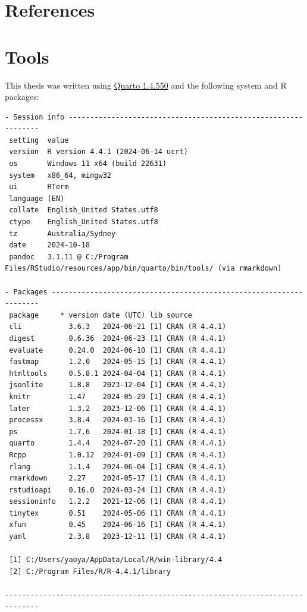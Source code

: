 \documentclass[
  a4paper,
  oneside,
  openany,
  12pt,
  onecolumn]{book}
\theoremstyle{plain}
\theoremstyle{definition}
\theoremstyle{remark}
\begin{document}

\chapter*{References}\label{references}


\renewcommand{\bibsection}{}


\cleardoublepage
{}
{}
\appendix

\chapter{Tools}\label{sec-tools}

This thesis was written using \href{https://quarto.org/}{Quarto 1.4.550}
\citep{quarto} and the following system and R packages:

\begin{verbatim}
- Session info ---------------------------------------------------------------
 setting  value
 version  R version 4.4.1 (2024-06-14 ucrt)
 os       Windows 11 x64 (build 22631)
 system   x86_64, mingw32
 ui       RTerm
 language (EN)
 collate  English_United States.utf8
 ctype    English_United States.utf8
 tz       Australia/Sydney
 date     2024-10-18
 pandoc   3.1.11 @ C:/Program Files/RStudio/resources/app/bin/quarto/bin/tools/ (via rmarkdown)

- Packages -------------------------------------------------------------------
 package     * version date (UTC) lib source
 cli           3.6.3   2024-06-21 [1] CRAN (R 4.4.1)
 digest        0.6.36  2024-06-23 [1] CRAN (R 4.4.1)
 evaluate      0.24.0  2024-06-10 [1] CRAN (R 4.4.1)
 fastmap       1.2.0   2024-05-15 [1] CRAN (R 4.4.1)
 htmltools     0.5.8.1 2024-04-04 [1] CRAN (R 4.4.1)
 jsonlite      1.8.8   2023-12-04 [1] CRAN (R 4.4.1)
 knitr         1.47    2024-05-29 [1] CRAN (R 4.4.1)
 later         1.3.2   2023-12-06 [1] CRAN (R 4.4.1)
 processx      3.8.4   2024-03-16 [1] CRAN (R 4.4.1)
 ps            1.7.6   2024-01-18 [1] CRAN (R 4.4.1)
 quarto        1.4.4   2024-07-20 [1] CRAN (R 4.4.1)
 Rcpp          1.0.12  2024-01-09 [1] CRAN (R 4.4.1)
 rlang         1.1.4   2024-06-04 [1] CRAN (R 4.4.1)
 rmarkdown     2.27    2024-05-17 [1] CRAN (R 4.4.1)
 rstudioapi    0.16.0  2024-03-24 [1] CRAN (R 4.4.1)
 sessioninfo   1.2.2   2021-12-06 [1] CRAN (R 4.4.1)
 tinytex       0.51    2024-05-06 [1] CRAN (R 4.4.1)
 xfun          0.45    2024-06-16 [1] CRAN (R 4.4.1)
 yaml          2.3.8   2023-12-11 [1] CRAN (R 4.4.1)

 [1] C:/Users/yaoya/AppData/Local/R/win-library/4.4
 [2] C:/Program Files/R/R-4.4.1/library

------------------------------------------------------------------------------
\end{verbatim}


\backmatter
\end{document}
